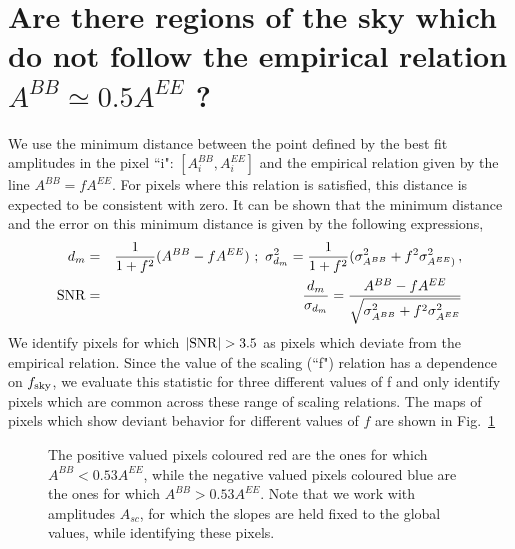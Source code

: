 \documentclass[12pt]{article}
\begin{document}
\section{Are there regions of the sky which do not follow the empirical relation $A^{BB} \simeq 0.5A^{EE}$ ? }

We use the minimum distance between the point defined by the best fit  amplitudes in the pixel ``i": $[A_i^{BB},A_i^{EE}]$  and the empirical relation given by the line $A^{BB} = f A^{EE}$.
For pixels where this relation is satisfied, this distance is expected to be consistent with zero. It can be shown that the minimum distance and the error on this minimum distance is given by the following expressions,
\begin{eqnarray}
d_m &= &\frac{1}{1+f^2} (A^{BB} - fA^{EE}) ~ ; ~ \sigma^2_{d_m} = \frac{1}{1+f^2} (\sigma^2_{A^{BB}} + f^2 \sigma^2_{A^{EE})} \,,\\
{\rm SNR}&=&\frac{d_m}{\sigma_{d_m}} = \frac{A^{BB} - fA^{EE}}{\sqrt{\sigma^2_{A^{BB}} + f^2 \sigma^2_{A^{EE}}}}
\end{eqnarray}
We identify pixels for which $|{\rm SNR}| > 3.5$ as pixels which deviate from the empirical relation. Since the value of the scaling (``f") relation has a dependence on $f_{\rm sky}$, we evaluate this statistic for three different values of f and only identify pixels which are common across these range of scaling relations. The maps of pixels which show deviant behavior for different values of $f$ are shown in Fig.~\ref{fig:amp_dev_pix}
\begin{figure}[!h]
\centering
{}
\caption{The positive valued pixels coloured red are the ones for which $A^{BB} < 0.53A^{EE}$, while the negative valued pixels coloured blue are the ones for which  $A^{BB} > 0.53A^{EE}$. Note that we work with amplitudes $A_{sc}$, for which the slopes are held fixed to the global values,  while identifying these pixels.}
\label{fig:amp_dev_pix}
\end{figure}
\end{document}
